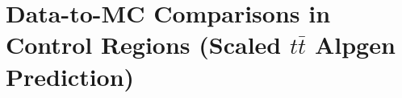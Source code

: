 \section{Data-to-MC Comparisons in Control Regions (Scaled $t\bar{t}$ {\sc Alpgen} Prediction)}
\label{app:DataMCControl_ScaledALPGEN}


\clearpage

\clearpage


